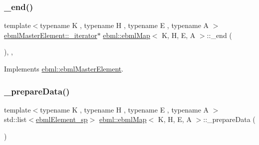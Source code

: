 \mbox{\label{classebml_1_1ebmlMap_a8b6a25187190a26a7988d4bbaf853d78}} 
\subsubsection{\texorpdfstring{\+\_\+end()}{\_end()}}
{\footnotesize\ttfamily template$<$typename K , typename H , typename E , typename A $>$ \\
\mbox{\hyperlink{classebml_1_1ebmlMasterElement_1_1__iterator}{ebml\+Master\+Element\+::\+\_\+iterator}}$\ast$ \mbox{\hyperlink{classebml_1_1ebmlMap}{ebml\+::ebml\+Map}}$<$ K, H, E, A $>$\+::\+\_\+end (\begin{DoxyParamCaption}{ }\end{DoxyParamCaption})\hspace{0.3cm}{\ttfamily [override]}, {\ttfamily [protected]}, {\ttfamily [virtual]}}



Implements \mbox{\hyperlink{classebml_1_1ebmlMasterElement_a352e5e11836063394990cb05c09d8e48}{ebml\+::ebml\+Master\+Element}}.

\mbox{\label{classebml_1_1ebmlMap_a7a57cf320540396c8010845aeae6db19}} 
\subsubsection{\texorpdfstring{\+\_\+prepare\+Data()}{\_prepareData()}\hspace{0.1cm}{\footnotesize\ttfamily [1/6]}}
{\footnotesize\ttfamily template$<$typename K , typename H , typename E , typename A $>$ \\
std\+::list$<$\mbox{\hyperlink{namespaceebml_adad533b7705a16bb360fe56380c5e7be}{ebml\+Element\+\_\+sp}}$>$ \mbox{\hyperlink{classebml_1_1ebmlMap}{ebml\+::ebml\+Map}}$<$ K, H, E, A $>$\+::\+\_\+prepare\+Data (\begin{DoxyParamCaption}\item[{const std\+::list$<$ std\+::pair$<$ \mbox{\hyperlink{namespaceebml_adad533b7705a16bb360fe56380c5e7be}{ebml\+Element\+\_\+sp}}, \mbox{\hyperlink{namespaceebml_adad533b7705a16bb360fe56380c5e7be}{ebml\+Element\+\_\+sp}} $>$$>$ \&}]{ }\end{DoxyParamCaption})\hspace{0.3cm}{\ttfamily [protected]}}

